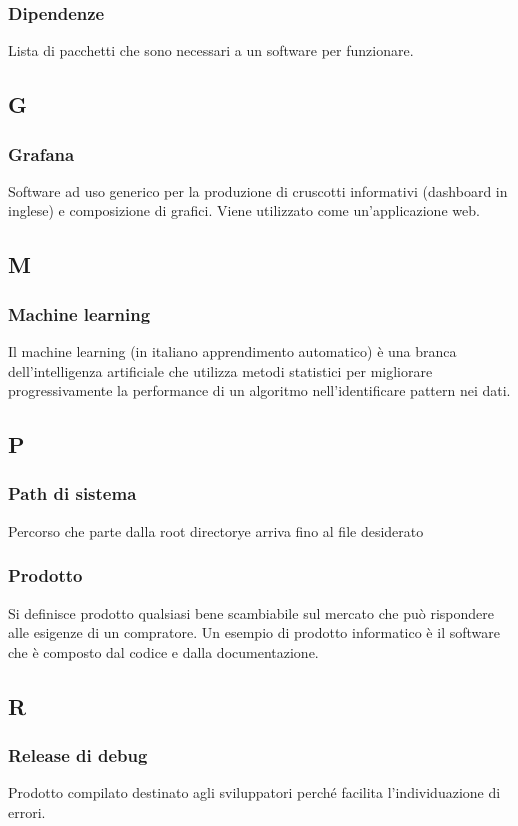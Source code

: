\subsubsection*{Dipendenze}
Lista di pacchetti che sono necessari a un software per funzionare.

\subsection*{G}
\subsubsection*{Grafana}
Software ad uso generico per la produzione di cruscotti informativi (dashboard in inglese) e composizione di grafici. Viene utilizzato come un'applicazione web.

\subsection*{M}
\subsubsection*{Machine learning}
Il machine learning (in italiano apprendimento automatico) è una branca dell'intelligenza artificiale che utilizza metodi statistici per migliorare progressivamente la performance di un algoritmo nell'identificare pattern nei dati.

\subsection*{P}
\subsubsection*{Path di sistema}
Percorso che parte dalla root directory\glosp e arriva fino al file desiderato
\subsubsection*{Prodotto}
Si definisce prodotto qualsiasi bene scambiabile sul mercato che può rispondere alle esigenze di un compratore. Un esempio di prodotto informatico è il software che è composto dal codice e dalla documentazione.	
	
\subsection*{R}
\subsubsection*{Release di debug}
Prodotto compilato destinato agli sviluppatori perché facilita l'individuazione di errori.

